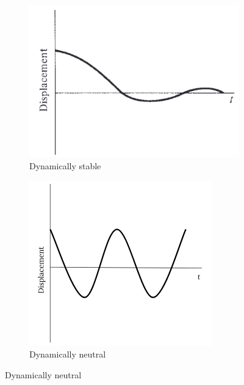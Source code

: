 \documentclass[12pt]{article}
\begin{document}
\begin{figure}[h]
     \centering
     \begin{subfigure}[b]{0.3\textwidth}
         \centering
         \includegraphics[width=\textwidth]{images/d stable.png}
         \caption{Dynamically stable}
         \label{fig:d.stable}
     \end{subfigure}
     \hfill
     \begin{subfigure}[b]{0.3\textwidth}
         \centering
         \includegraphics[width=\textwidth]{images/d neutral.png}
         \caption{Dynamically neutral}
         \label{fig:d.neutral}

\end{subfigure}
\end{figure}
\end{document}

